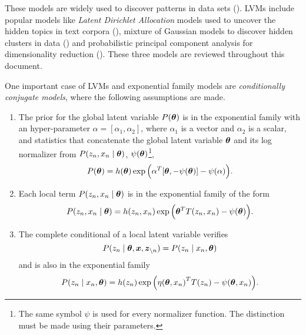 \begin{remark}
  These models are widely used to discover patterns in data sets (\cite{blei2014build}).
  LVMs include popular models like \emph{Latent Dirichlet Allocation} models used to uncover the hidden topics in text corpora (\cite{blei2003latent}), mixture of Gaussian models to discover hidden clusters in data (\cite{bishop2006pattern}) and probabilistic principal component analysis for dimensionality reduction (\cite{tipping1999probabilistic}). These three models are reviewed throughout this document.
\end{remark}

One important case of LVMs and exponential family models are \emph{conditionally conjugate models}, where the following assumptions are made.
\begin{enumerate}[itemsep=2ex]
  \item The prior for the global latent variable \(P(\bm{\theta})\) is in the exponential family with an hyper-parameter \(\alpha = [\alpha_{1}, \alpha_{2}]\), where \(\alpha_{1}\) is a vector and \(\alpha_{2}\) is a scalar, and statistics that concatenate the global latent variable \(\bm{\theta}\)  and its log normalizer from \(P(z_{n}, x_{n} \mid \bm{\theta})\), \(\psi(\bm{\theta})\)\footnote{The same symbol \(\psi\) is used for every normalizer function. The distinction must be made using their parameters. },
    \[
    P(\bm{\theta}) = h(\bm{\theta}) \exp \Big( \alpha^{T}[\bm{\theta}, -\psi(\bm{\theta})] - \psi(\alpha)\Big).
    \]
  \item Each local term \(P(z_{n},x_{n} \mid \bm{\theta})\) is in the exponential family of the form
    \[
    P(z_{n},x_{n} \mid \bm{\theta}) = h(z_{n}, x_{n}) \exp \Big( \bm{\theta}^{T} T(z_{n}, x_{n}) - \psi(\bm{\theta}) \Big).
    \]
  \item The complete conditional of a local latent variable verifies
    \[
    P(z_{n} \mid \bm{\theta}, \bm{x}, \bm{z}_{\backslash n}) = P(z_{n} \mid x_{n}, \bm{\theta})
    \]
    and is also in the exponential family
    \[
    P(z_{n}\mid x_{n} , \bm{\theta}) =  h(z_{n})\exp \Big( {\eta(\bm{\theta}, x_{n})}^{T}T(z_{n}) - \psi(\bm{\theta}, x_{n}) \Big).
    \]
\end{enumerate}

